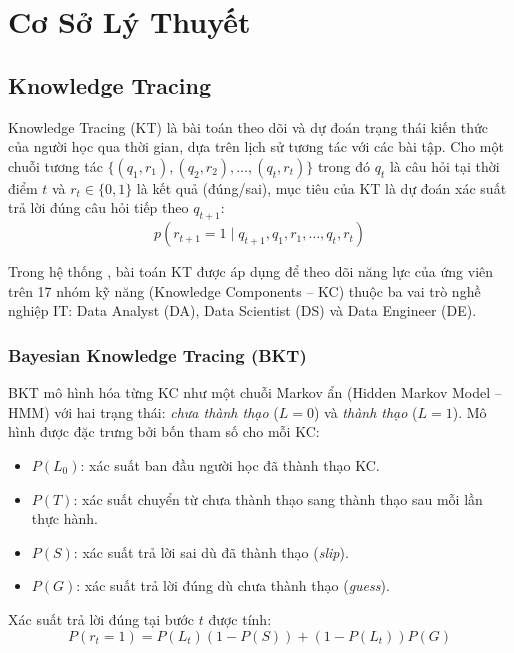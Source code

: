 \chapter{Cơ Sở Lý Thuyết}
\label{chap:theory}

\section{Knowledge Tracing}
\label{sec:kt}

Knowledge Tracing (KT) là bài toán theo dõi và dự đoán trạng thái kiến thức của người học qua thời gian, dựa trên lịch sử tương tác với các bài tập. Cho một chuỗi tương tác $\{(q_1, r_1), (q_2, r_2), \ldots, (q_t, r_t)\}$ trong đó $q_t$ là câu hỏi tại thời điểm $t$ và $r_t \in \{0, 1\}$ là kết quả (đúng/sai), mục tiêu của KT là dự đoán xác suất trả lời đúng câu hỏi tiếp theo $q_{t+1}$:
\begin{equation}
  p(r_{t+1} = 1 \mid q_{t+1}, q_1, r_1, \ldots, q_t, r_t)
\end{equation}

Trong hệ thống \system{}, bài toán KT được áp dụng để theo dõi năng lực của ứng viên trên 17 nhóm kỹ năng (Knowledge Components -- KC) thuộc ba vai trò nghề nghiệp IT: Data Analyst (DA), Data Scientist (DS) và Data Engineer (DE).

\subsection{Bayesian Knowledge Tracing (BKT)}
\label{subsec:bkt}

BKT \cite{corbett1994knowledge} mô hình hóa từng KC như một chuỗi Markov ẩn (Hidden Markov Model -- HMM) với hai trạng thái: \textit{chưa thành thạo} ($L=0$) và \textit{thành thạo} ($L=1$). Mô hình được đặc trưng bởi bốn tham số cho mỗi KC:

\begin{itemize}
  \item $P(L_0)$: xác suất ban đầu người học đã thành thạo KC.
  \item $P(T)$: xác suất chuyển từ chưa thành thạo sang thành thạo sau mỗi lần thực hành.
  \item $P(S)$: xác suất trả lời sai dù đã thành thạo (\textit{slip}).
  \item $P(G)$: xác suất trả lời đúng dù chưa thành thạo (\textit{guess}).
\end{itemize}

Xác suất trả lời đúng tại bước $t$ được tính:
\begin{equation}
  P(r_t = 1) = P(L_t)(1 - P(S)) + (1 - P(L_t))P(G)
\end{equation}

